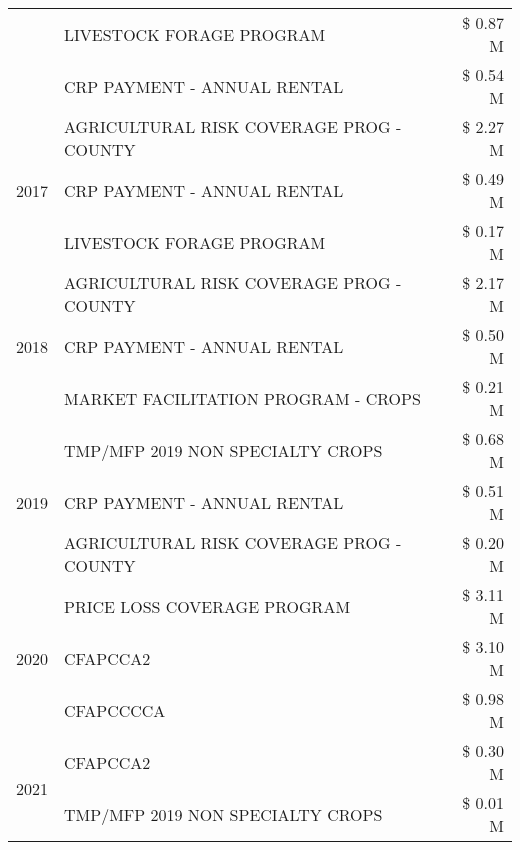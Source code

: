 \begin{tabular}{llr}
 & LIVESTOCK FORAGE PROGRAM & \$ 0.87 M \\
 & CRP PAYMENT - ANNUAL RENTAL & \$ 0.54 M \\
\cline{1-3}
\multirow[t]{3}{*}{2017} & AGRICULTURAL RISK COVERAGE PROG - COUNTY & \$ 2.27 M \\
 & CRP PAYMENT - ANNUAL RENTAL & \$ 0.49 M \\
 & LIVESTOCK FORAGE PROGRAM & \$ 0.17 M \\
\cline{1-3}
\multirow[t]{3}{*}{2018} & AGRICULTURAL RISK COVERAGE PROG - COUNTY & \$ 2.17 M \\
 & CRP PAYMENT - ANNUAL RENTAL & \$ 0.50 M \\
 & MARKET FACILITATION PROGRAM - CROPS & \$ 0.21 M \\
\cline{1-3}
\multirow[t]{3}{*}{2019} & TMP/MFP 2019 NON SPECIALTY CROPS & \$ 0.68 M \\
 & CRP PAYMENT - ANNUAL RENTAL & \$ 0.51 M \\
 & AGRICULTURAL RISK COVERAGE PROG - COUNTY & \$ 0.20 M \\
\cline{1-3}
\multirow[t]{3}{*}{2020} & PRICE LOSS COVERAGE PROGRAM & \$ 3.11 M \\
 & CFAPCCA2 & \$ 3.10 M \\
 & CFAPCCCCA & \$ 0.98 M \\
\cline{1-3}
\multirow[t]{2}{*}{2021} & CFAPCCA2 & \$ 0.30 M \\
 & TMP/MFP 2019 NON SPECIALTY CROPS & \$ 0.01 M \\
\cline{1-3}
\bottomrule
\end{tabular}
